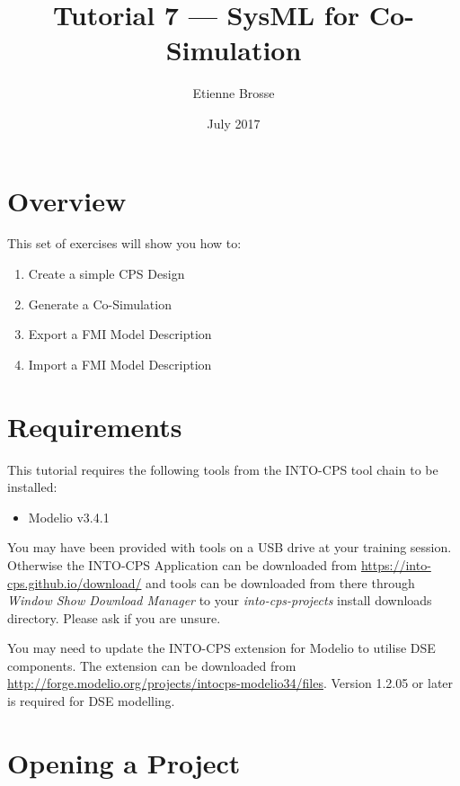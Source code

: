 \documentclass[11pt,a4paper]{../tutorial}
\title{Tutorial 7 --- SysML for Co-Simulation}
\date{July 2017}
\author{Etienne Brosse}
\begin{document}
\section*{Overview}

This set of exercises will show you how to:

\begin{enumerate}[noitemsep]
\item Create a simple CPS Design
\item Generate a Co-Simulation
\item Export a FMI Model Description
\item Import a FMI Model Description

\end{enumerate}

\section*{Requirements}

This tutorial requires the following tools from the INTO-CPS tool chain to be installed:

\begin{itemize}[noitemsep]
\item Modelio v3.4.1
\end{itemize}

You may have been provided with tools on a USB drive at your training session. Otherwise the INTO-CPS Application can be downloaded from \url{https://into-cps.github.io/download/} and tools can be downloaded from there through \emph{Window \menusep Show Download Manager} to your \emph{into-cps-projects} install downloads directory. Please ask if you are unsure.

\vspace{4mm}

You may need to update the INTO-CPS extension for Modelio to utilise DSE components. The extension can be downloaded from \mbox{\url{http://forge.modelio.org/projects/intocps-modelio34/files}}. Version 1.2.05 or later is required for DSE modelling.

\newpage

\section{Opening a Project}
\end{document}
